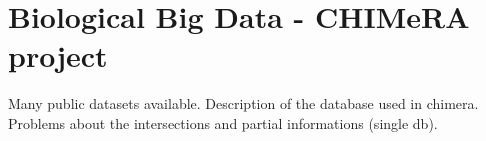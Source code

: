 \documentclass{standalone}
\begin{document}
\chapter[Big Data]{Biological Big Data - CHIMeRA project}\label{bigdata}

Many public datasets available.
Description of the database used in chimera.
Problems about the intersections and partial informations (single db).
\end{document}
